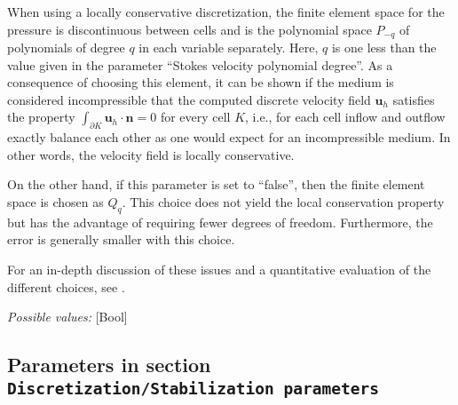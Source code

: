 \begin{itemize}
When using a locally conservative discretization, the finite element space for the pressure is discontinuous between cells and is the polynomial space $P_ {-q}$ of polynomials of degree $q$ in each variable separately. Here, $q$ is one less than the value given in the parameter ``Stokes velocity polynomial degree''. As a consequence of choosing this element, it can be shown if the medium is considered incompressible that the computed discrete velocity field $\mathbf u_h$ satisfies the property $\int_ {\partial K} \mathbf u_h \cdot \mathbf n = 0$ for every cell $K$, i.e., for each cell inflow and outflow exactly balance each other as one would expect for an incompressible medium. In other words, the velocity field is locally conservative.

On the other hand, if this parameter is set to ``false'', then the finite element space is chosen as $Q_q$. This choice does not yield the local conservation property but has the advantage of requiring fewer degrees of freedom. Furthermore, the error is generally smaller with this choice.

For an in-depth discussion of these issues and a quantitative evaluation of the different choices, see \cite {KHB12} .


{\it Possible values:} [Bool]
\end{itemize}



\subsection{Parameters in section \tt Discretization/Stabilization parameters}
\label{parameters:Discretization/Stabilization_20parameters}

